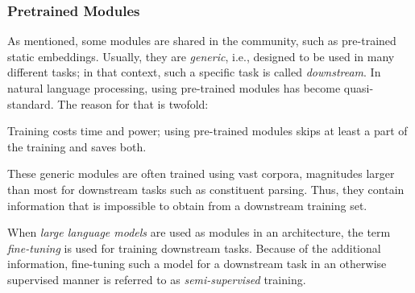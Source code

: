 \documentclass[../document.tex]{subfiles}
\begin{document}
    \subsubsection{Pretrained Modules}
    As mentioned, some modules are shared in the community, such as pre-trained static embeddings.
    Usually, they are \emph{generic}, i.e.\@, designed to be used in many different tasks; in that context, such a specific task is called \emph{downstream}.
    In natural language processing, using pre-trained modules has become quasi-standard.
    The reason for that is twofold:
    \begin{compactitem}
        \item
            Training costs time and power; using pre-trained modules skips at least a part of the training and saves both.
        \item
            These generic modules are often trained using vast corpora, magnitudes larger than most for downstream tasks such as constituent parsing.
            Thus, they contain information that is impossible to obtain from a downstream training set.
    \end{compactitem}
    When \emph{large language models} are used as modules in an architecture, the term \emph{fine-tuning} is used for training downstream tasks.
    Because of the additional information, fine-tuning such a model for a downstream task in an otherwise supervised manner is referred to as \emph{semi-supervised} training.
\end{document}

